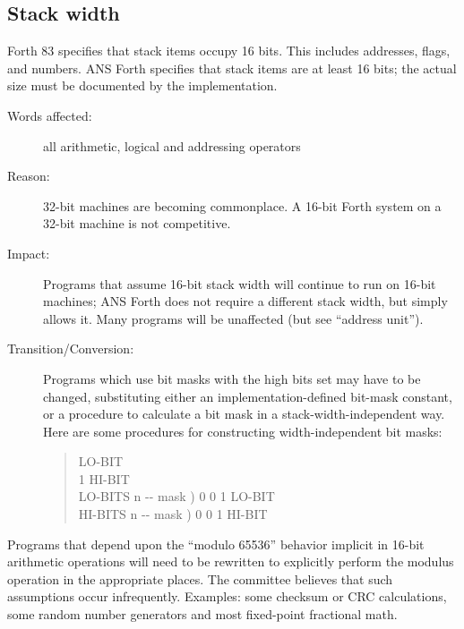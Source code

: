 \subsection{Stack width} %

Forth 83 specifies that stack items occupy 16 bits. This includes
addresses, flags, and numbers. ANS Forth specifies that stack items
are at least 16 bits; the actual size must be documented by the
implementation.

\begin{description}
\item[Words affected:]
	all arithmetic, logical and addressing operators

\item[Reason:]
	32-bit machines are becoming commonplace. A 16-bit Forth
	system on a 32-bit machine is not competitive.

\item[Impact:]
	Programs that assume 16-bit stack width will continue to run on
	16-bit machines; ANS Forth does not require a different stack
	width, but simply allows it. Many programs will be unaffected
	(but see ``address unit'').

\item[Transition/Conversion:]
	Programs which use bit masks with the high bits set may have to
	be changed, substituting either an implementation-defined bit-mask
	constant, or a procedure to calculate a bit mask in a
	stack-width-independent way. Here are some procedures for
	constructing width-independent bit masks:
	\begin{quote}  LO-BIT \\
		 1 
			\quad {}
			\quad {} HI-BIT \\
		\word{:} LO-BITS  n -{}- mask )
			0 	0 
				1 		LO-BIT 
		\word{;} \\
		\word{:} HI-BITS  n -{}- mask )
			0 	0 
				1 	HI-BIT 
		\word{;} \\
	\end{quote}
\end{description}

Programs that depend upon the ``modulo 65536'' behavior implicit in
16-bit arithmetic operations will need to be rewritten to explicitly
perform the modulus operation in the appropriate places. The committee
believes that such assumptions occur infrequently. Examples: some
checksum or CRC calculations, some random number generators and most
fixed-point fractional math.


